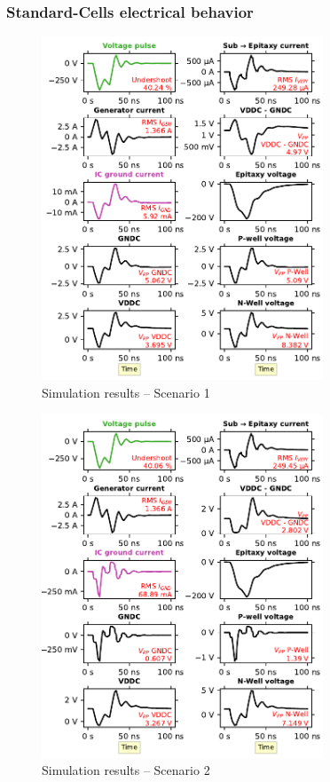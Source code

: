 \documentclass[10pt, conference, compsocconf]{IEEEtran}
\begin{document}
\subsubsection{\textbf{Standard-Cells electrical behavior}}
\label{subsubsection:scsExpl}

\begin{figure}[!hbtp]
\centering
\includegraphics[width=3.3in]{latexM0_T}
\caption{Simulation results – Scenario 1}
\label{sM0L}
\end{figure}

\begin{figure}[!hbtp]
\centering
\includegraphics[width=3.3in]{latexM1_T}
\caption{Simulation results – Scenario 2}
\label{sM1L}
\end{figure}
\end{document}
